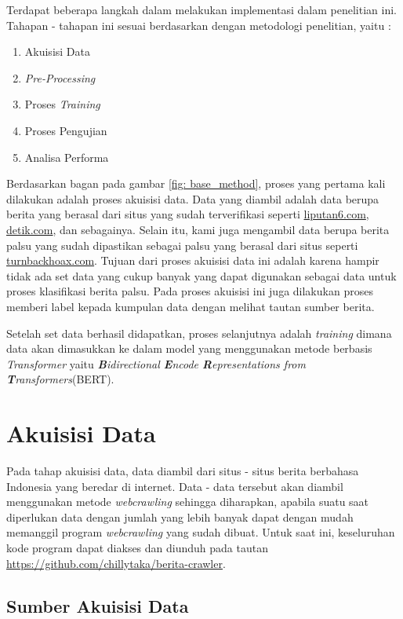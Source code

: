 Terdapat beberapa langkah dalam melakukan implementasi dalam penelitian ini. Tahapan - tahapan ini sesuai berdasarkan dengan metodologi penelitian, yaitu :

\begin{enumerate}[nolistsep]
  \item Akuisisi Data
  \item \textit{Pre-Processing}
  \item Proses \textit{Training}
  \item Proses Pengujian
  \item Analisa Performa
\end{enumerate}

Berdasarkan bagan pada gambar \ref{fig: base_method}, proses yang pertama kali dilakukan adalah proses akuisisi data. Data yang diambil adalah data berupa berita yang berasal dari situs yang sudah terverifikasi seperti \url{liputan6.com}, \url{detik.com}, dan sebagainya. Selain itu, kami juga mengambil data berupa berita palsu yang sudah dipastikan sebagai palsu yang berasal dari situs seperti \url{turnbackhoax.com}. Tujuan dari proses akuisisi data ini adalah karena hampir tidak ada set data yang cukup banyak yang dapat digunakan sebagai data untuk proses klasifikasi berita palsu. Pada proses akuisisi ini juga dilakukan proses memberi label kepada kumpulan data dengan melihat tautan sumber berita.

Setelah set data berhasil didapatkan, proses selanjutnya adalah \textit{training} dimana data akan dimasukkan ke dalam model yang menggunakan metode berbasis \textit{Transformer} yaitu \textit{\textbf{B}idirectional \textbf{E}ncode \textbf{R}epresentations from \textbf{T}ransformers}(BERT).

\section{Akuisisi Data}

Pada tahap akuisisi data, data diambil dari situs - situs berita berbahasa Indonesia yang beredar di internet. Data - data tersebut akan diambil menggunakan metode \textit{webcrawling} sehingga diharapkan, apabila suatu saat diperlukan data dengan jumlah yang lebih banyak dapat dengan mudah memanggil program \textit{webcrawling} yang sudah dibuat. Untuk saat ini, keseluruhan kode program dapat diakses dan diunduh pada tautan \url{https://github.com/chillytaka/berita-crawler}.

\subsection{Sumber Akuisisi Data}

